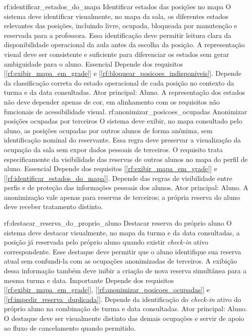 \reqfuncfull
{rf:identificar_estados_do_mapa}
{Identificar estados das posições no mapa}
{O sistema deve identificar visualmente, no mapa da sala, os diferentes estados relevantes das posições, incluindo livre, ocupada, bloqueada por manutenção e reservada para a professora. Essa identificação deve permitir leitura clara da disponibilidade operacional da aula antes da escolha da posição. A representação visual deve ser consistente e suficiente para diferenciar os estados sem gerar ambiguidade para o aluno.}
{Essencial}
{Depende dos requisitos [\ref{rf:exibir_mapa_em_grade}] e [\ref{rf:bloquear_posicoes_indisponiveis}]. Depende da classificação correta do estado operacional de cada posição no contexto da turma e da data consultadas.}
{Ator principal: Aluno. A representação dos estados não deve depender apenas de cor, em alinhamento com os requisitos não funcionais de acessibilidade visual.}
\reqfuncfull
{rf:anonimizar_posicoes_ocupadas}
{Anonimizar posições ocupadas por terceiros}
{O sistema deve exibir, no mapa consultado pelo aluno, as posições ocupadas por outros alunos de forma anônima, sem identificação nominal do reservante. Essa regra deve preservar a visualização da ocupação da sala sem expor dados pessoais de terceiros. O requisito trata especificamente da visibilidade das reservas de outros alunos no mapa do perfil de aluno.}
{Essencial}
{Depende dos requisitos [\ref{rf:exibir_mapa_em_grade}] e [\ref{rf:identificar_estados_do_mapa}]. Depende das regras de visibilidade entre perfis e de proteção das informações pessoais dos alunos.}
{Ator principal: Aluno. A anonimização vale apenas para reservas de terceiros; a própria reserva do aluno deve receber tratamento distinto.}

\reqfuncfull
{rf:destacar_reserva_do_proprio_aluno}
{Destacar reserva do próprio aluno}
{O sistema deve destacar visualmente, no mapa da turma e da data consultadas, a posição já reservada pelo próprio aluno quando existir \textit{check-in} ativo correspondente. Esse destaque deve permitir que o aluno identifique sua reserva atual sem confundi-la com as ocupações anonimizadas de terceiros. A exibição dessa informação também deve inibir a criação de nova reserva simultânea para a mesma turma e data.}
{Importante}
{Depende dos requisitos [\ref{rf:exibir_mapa_em_grade}], [\ref{rf:anonimizar_posicoes_ocupadas}] e [\ref{rf:impedir_reserva_duplicada}]. Depende da identificação do \textit{check-in} ativo do próprio aluno na combinação de turma e data consultadas.}
{Ator principal: Aluno. O destaque deve ser visualmente distinto das demais ocupações e servir de apoio ao fluxo de cancelamento quando permitido.}

